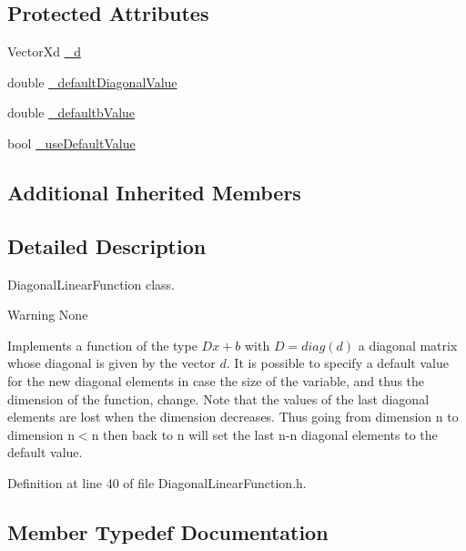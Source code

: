 \subsection*{Protected Attributes}
\begin{DoxyCompactItemize}
\item 
Vector\+Xd \hyperlink{classocra_1_1DiagonalLinearFunction_adf9d157af394f4322d71720bea545f00}{\+\_\+d}
\item 
double \hyperlink{classocra_1_1DiagonalLinearFunction_aa7150368fce9c7c6c3724b801f498749}{\+\_\+default\+Diagonal\+Value}
\item 
double \hyperlink{classocra_1_1DiagonalLinearFunction_ab004421a9f01bd2c3fa5b97b7532c6c2}{\+\_\+defaultb\+Value}
\item 
bool \hyperlink{classocra_1_1DiagonalLinearFunction_a27e25618f0812c42967b363ad3f77fd6}{\+\_\+use\+Default\+Value}
\end{DoxyCompactItemize}
\subsection*{Additional Inherited Members}


\subsection{Detailed Description}
Diagonal\+Linear\+Function class. 

\begin{DoxyWarning}{Warning}
None
\end{DoxyWarning}
Implements a function of the type $ Dx+b $ with $ D=diag(d) $ a diagonal matrix whose diagonal is given by the vector $ d $. It is possible to specify a default value for the new diagonal elements in case the size of the variable, and thus the dimension of the function, change. Note that the values of the last diagonal elements are lost when the dimension decreases. Thus going from dimension n to dimension n\textquotesingle{}$<$n then back to n will set the last n-\/n\textquotesingle{} diagonal elements to the default value. 

Definition at line 40 of file Diagonal\+Linear\+Function.\+h.



\subsection{Member Typedef Documentation}
